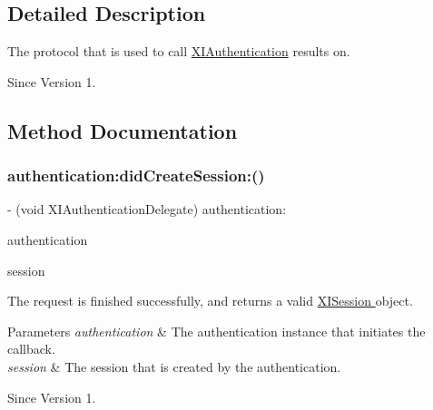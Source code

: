 \subsection{Detailed Description}
The protocol that is used to call \hyperlink{class_x_i_authentication}{X\+I\+Authentication} results on. 

\begin{DoxySince}{Since}
Version 1. 
\end{DoxySince}


\subsection{Method Documentation}
\hypertarget{protocol_x_i_authentication_delegate_01-p_a4f0b8feb3b461d717acc0fc627f1d04d}{}\label{protocol_x_i_authentication_delegate_01-p_a4f0b8feb3b461d717acc0fc627f1d04d} 
\subsubsection{\texorpdfstring{authentication\+:did\+Create\+Session\+:()}{authentication:didCreateSession:()}}
{\footnotesize\ttfamily -\/ (void X\+I\+Authentication\+Delegate) authentication\+: \begin{DoxyParamCaption}\item[{(\hyperlink{class_x_i_authentication}{X\+I\+Authentication} $\ast$)}]{authentication }\item[{didCreateSession:(id$<$ X\+I\+Session $>$)}]{session }\end{DoxyParamCaption}}



The request is finished successfully, and returns a valid \hyperlink{}{X\+I\+Session } object. 


\begin{DoxyParams}{Parameters}
{\em authentication} & The authentication instance that initiates the callback. \\
\hline
{\em session} & The session that is created by the authentication. \\
\hline
\end{DoxyParams}
\begin{DoxySince}{Since}
Version 1. 
\end{DoxySince}
\hypertarget{protocol_x_i_authentication_delegate_01-p_a926311c03672c51b3a58e8590bc74c14}{}\label{protocol_x_i_authentication_delegate_01-p_a926311c03672c51b3a58e8590bc74c14} 
